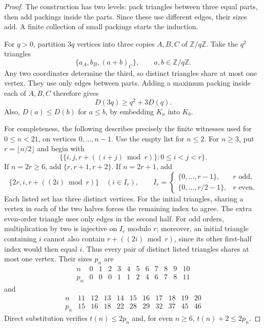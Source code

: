 \documentclass[11pt]{article}
\theoremstyle{remark}
\begin{document}
\begin{proof}
The construction has two levels: pack triangles between three equal parts,
then add packings inside the parts.  Since these use different edges, their
sizes add.  A finite collection of small packings starts the induction.

For $q>0$, partition $3q$ vertices into three copies $A,B,C$ of
$\mathbb Z/q\mathbb Z$.  Take the $q^2$ triangles
\[
  \{a_A,b_B,(a+b)_C\},\qquad a,b\in\mathbb Z/q\mathbb Z.
\]
Any two coordinates determine the third, so distinct triangles share at
most one vertex.  They use only edges between parts.  Adding a maximum
packing inside each of $A,B,C$ therefore gives
\begin{equation}\label{eq:latin-recurrence}
  D(3q)\geq q^2+3D(q).
\end{equation}
Also, $D(a)\leq D(b)$ for $a\leq b$, by embedding $K_a$ into $K_b$.

For completeness, the following describes precisely the finite witnesses
used for $0\leq n<21$, on vertices $0,\ldots,n-1$.  Use the empty list
for $n\leq2$.  For $n\geq3$, put $r=\lfloor n/2\rfloor$ and begin with
\[
  \bigl\{\{i,j,r+((i+j)\bmod r)\}:0\leq i<j<r\bigr\}.
\]
If $n=2r\geq6$, add $\{r,r+1,r+2\}$.  If $n=2r+1$, add
\[
  \{2r,i,r+((2i)\bmod r)\}\quad (i\in I_r),\qquad
  I_r=\begin{cases}
    \{0,\ldots,r-1\},&r\text{ odd},\\
    \{0,\ldots,r/2-1\},&r\text{ even}.
  \end{cases}
\]
Each listed set has three distinct vertices.  For the initial triangles,
sharing a vertex in each of the two halves forces the remaining index to
agree.  The extra even-order triangle uses only edges in the second half.
For odd orders, multiplication by two is injective on $I_r$ modulo $r$;
moreover, an initial triangle containing $i$ cannot also contain
$r+((2i)\bmod r)$, since its other first-half index would then equal $i$.
Thus every pair of distinct listed triangles shares at most one vertex.
Their sizes $p_n$ are
\[
\begin{array}{c|rrrrrrrrrrr}
n&0&1&2&3&4&5&6&7&8&9&10\\\hline
p_n&0&0&0&1&1&2&4&6&7&8&11
\end{array}
\]
and
\[
\begin{array}{c|rrrrrrrrrr}
n&11&12&13&14&15&16&17&18&19&20\\\hline
p_n&15&16&18&22&28&29&32&37&45&46
\end{array}
\]
Direct substitution verifies $t(n)\leq2p_n$ and, for even $n\geq6$,
$t(n)+2\leq2p_n$.


\end{proof}
\end{document}
